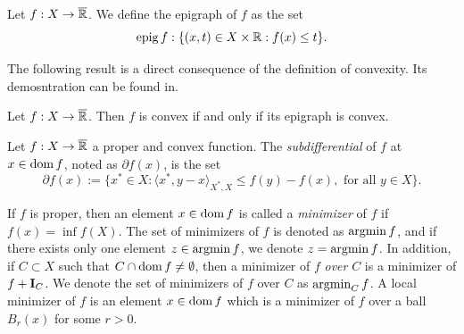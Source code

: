 \begin{definition}\label{def:epig}
    Let $f:X\to\overline{\mathbb{R}}$. We define the epigraph of $f$ as the set
    \[
    \operatorname{epig}{f}:\{(x,t)\in X\times \mathbb{R}: f(x)\le t\}.
    \]
\end{definition}
    The following result is a direct consequence of the definition of convexity. Its demosntration can be found in\cite{combettes}.
    \begin{proposition}\label{th:epig_convex}
        Let $f:X\to \overline{\mathbb{R}}$. Then $f$ is convex if and only if its epigraph is convex.
    \end{proposition}

\begin{definition}\label{convex_subb}
    Let $f:X\to\overline{\mathbb{R}}$ a proper and convex function. The \textit{subdifferential} of $f$ at $x\in \operatorname{dom}{f}$, noted as $\partial f(x)$, is the set
    \[
    \partial f(x):=\{x^*\in X: \langle x^*,y-x\rangle_{X^*,X}\le f(y)-f(x),\mbox{ for all }y\in X \}.
    \]    
\end{definition}

If $f$ is proper, then an element $x\in \operatorname{dom}{f}$ is called a \textit{minimizer} of $f$ if $f(x)=\inf f(X)$. The set of minimizers of $f$ is denoted as $\operatorname{argmin} f$, and if there exists only one element $z\in \operatorname{argmin} f$, we denote $z=\operatorname{argmin} f$. In addition, if $C\subset X$ such that $C\cap \operatorname{dom}{f}\ne \emptyset$, then a minimizer of $f$ \textit{over} $C$ is a minimizer of $f+\mathbf{I}_{C}$. We denote the set of minimizers of $f$ over $C$ as $\operatorname{argmin}_{C} f$. A local minimizer of $f$ is an element $x\in \operatorname{dom} f$ which is a minimizer of $f$ over a ball $B_{r}(x)$ for some $r>0$.\\

